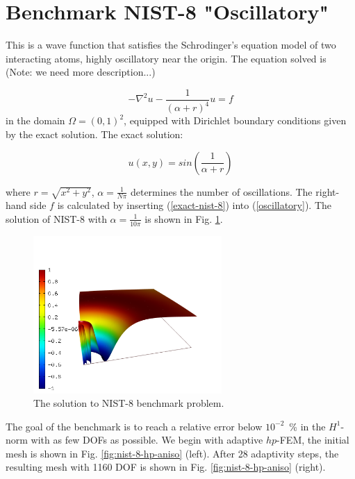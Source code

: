 \section{Benchmark NIST-8 "Oscillatory"}
\label{sec:bench-8}

This is a wave function that satisfies the Schrodinger's equation model of two
interacting atoms, highly oscillatory near the origin.
The equation solved is (Note: we need more description...)

\begin{equation} \label{oscillatory}
-\nabla^{2} u - \frac{1}{(\alpha + r)^{4}} u = f
\end{equation}
in the domain $\Omega = (0, 1)^2$, equipped with Dirichlet boundary conditions
given by the exact solution. The exact solution:

\begin{equation}\label{exact-nist-8}
u(x,y) = sin(\frac{1}{\alpha + r})
\end{equation}

where $r = \sqrt{x^{2} + y^{2}}$, $\alpha = \frac{1}{N \pi}$ determines the number of oscillations.
The right-hand side $f$ is calculated by inserting (\ref{exact-nist-8}) into (\ref{oscillatory}).
The solution of NIST-8 with $\alpha = \frac{1}{10 \pi}$ is shown in Fig. \ref{fig:sln-nist08}.

\begin{figure}[!ht]
\centering
\includegraphics[height=6cm]{nist/nist-8/solution.png}
\caption{The solution to NIST-8 benchmark problem.}
\label{fig:sln-nist08}
\end{figure}

The goal of the benchmark is to reach a relative error below
$10^{-2}$~\% in the $H^1$-norm with as few DOFs as possible.
We begin with adaptive $hp$-FEM, 
the initial mesh is shown in Fig. \ref{fig:nist-8-hp-aniso} (left).
After 28 adaptivity steps, the resulting mesh with 1160 DOF is shown 
in Fig. \ref{fig:nist-8-hp-aniso} (right).

